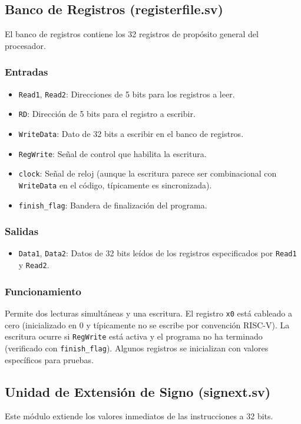 \documentclass[conference]{IEEEtran}
\begin{document}
\subsection{Banco de Registros (registerfile.sv)}
El banco de registros contiene los 32 registros de propósito general del procesador.
\subsubsection{Entradas}
\begin{itemize}
    \item \texttt{Read1}, \texttt{Read2}: Direcciones de 5 bits para los registros a leer.
    \item \texttt{RD}: Dirección de 5 bits para el registro a escribir.
    \item \texttt{WriteData}: Dato de 32 bits a escribir en el banco de registros.
    \item \texttt{RegWrite}: Señal de control que habilita la escritura.
    \item \texttt{clock}: Señal de reloj (aunque la escritura parece ser combinacional con \texttt{WriteData} en el código, típicamente es sincronizada).
    \item \texttt{finish\_flag}: Bandera de finalización del programa.
\end{itemize}
\subsubsection{Salidas}
\begin{itemize}
    \item \texttt{Data1}, \texttt{Data2}: Datos de 32 bits leídos de los registros especificados por \texttt{Read1} y \texttt{Read2}.
\end{itemize}
\subsubsection{Funcionamiento}
Permite dos lecturas simultáneas y una escritura. El registro \texttt{x0} está cableado a cero (inicializado en 0 y típicamente no se escribe por convención RISC-V). La escritura ocurre si \texttt{RegWrite} está activa y el programa no ha terminado (verificado con \texttt{finish\_flag}). Algunos registros se inicializan con valores específicos para pruebas.

\subsection{Unidad de Extensión de Signo (signext.sv)}
Este módulo extiende los valores inmediatos de las instrucciones a 32 bits.
\end{document}
